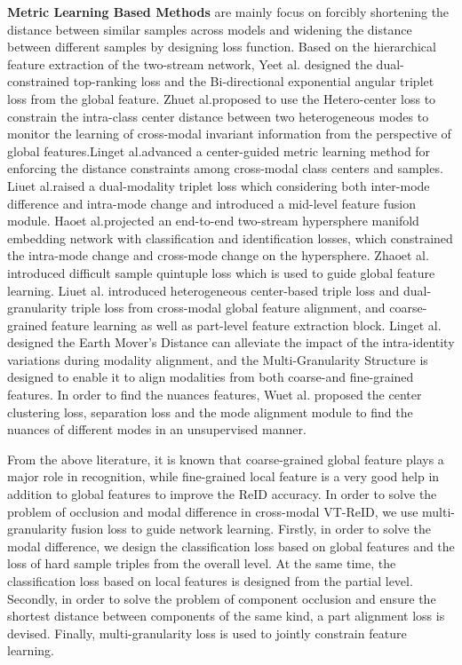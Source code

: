 \documentclass[journal]{IEEEtran}
\begin{document}
	\textbf{Metric Learning Based Methods} are mainly focus on forcibly shortening the distance between similar samples across models and widening the distance between different samples by designing loss function. Based on the hierarchical feature extraction of the two-stream network, Ye\textsuperscript{\cite{ye2020bi,ye2018visible}}et al. designed the dual-constrained top-ranking loss and the Bi-directional exponential angular triplet loss from the global feature. Zhu\textsuperscript{\cite{zhu2020hetero}}et al.proposed to use the Hetero-center loss to constrain the intra-class center distance between two heterogeneous modes to monitor the learning of cross-modal invariant information from the perspective of global features.Ling\textsuperscript{\cite{ling2020class}}et al.advanced a center-guided metric learning method for enforcing the distance constraints among cross-modal class centers and samples. Liu\textsuperscript{\cite{liu2020enhancing}}et al.raised a dual-modality triplet loss which considering both inter-mode difference and intra-mode change and introduced a mid-level feature fusion module. Hao\textsuperscript{\cite{hao2019hsme}}et al.projected an end-to-end two-stream hypersphere manifold embedding network with classification and identification losses, which constrained the intra-mode change and cross-mode change on the hypersphere. Zhao\textsuperscript{\cite{zhao2019hpiln}}et al. introduced difficult sample quintuple loss which is used to guide global feature learning. Liu\textsuperscript{\cite{liu2021strong,liu2020parameter}}et al. introduced heterogeneous center-based triple loss and dual-granularity triple loss from cross-modal global feature alignment, and coarse-grained feature learning as well as part-level feature extraction block. Ling\textsuperscript{\cite{ling2022cross}}et al. designed the Earth Mover’s Distance can alleviate the impact of the intra-identity variations during modality alignment, and the Multi-Granularity Structure is designed to enable it to align modalities from both coarse-and fine-grained features. In order to find the nuances features, Wu\textsuperscript{\cite{wu2021discover}}et al. proposed the center clustering loss, separation loss and the mode alignment module to find the nuances of different modes in an unsupervised manner. 
	
	From the above literature, it is known that coarse-grained global feature plays a major role in recognition, while fine-grained local feature is a very good help in addition to global features to improve the ReID accuracy. In order to solve the problem of occlusion and modal difference in cross-modal VT-ReID, we use multi-granularity fusion loss to guide network learning. Firstly, in order to solve the modal difference, we design the classification loss based on global features and the loss of hard sample triples from the overall level. At the same time, the classification loss based on local features is designed from the partial level. Secondly, in order to solve the problem of component occlusion and ensure the shortest distance between components of the same kind, a part alignment loss is devised. Finally, multi-granularity loss is used to jointly constrain feature learning.	
\end{document}
